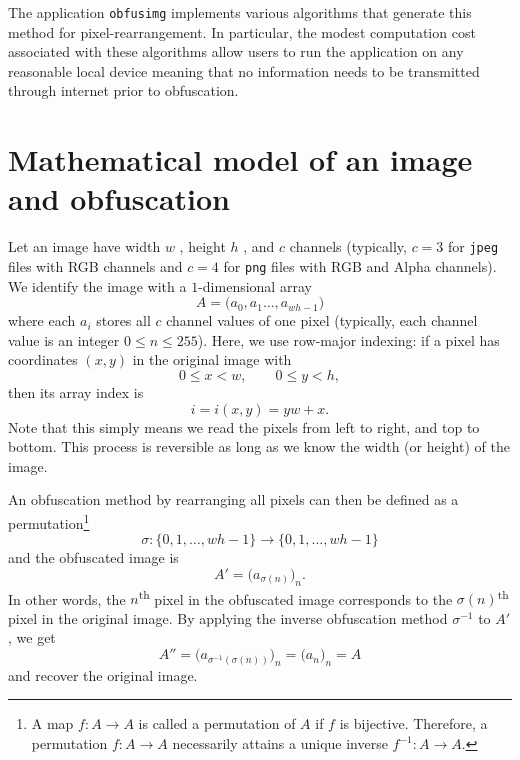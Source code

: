 \documentclass[12pt, a4paper, twoside]{article}
\begin{document}
The application \texttt{obfusimg} implements various algorithms that generate this method for pixel-rearrangement. In particular, the modest computation cost associated with these algorithms allow users to run the application on any reasonable local device meaning that no information needs to be transmitted through internet prior to obfuscation.

\section{Mathematical model of an image and obfuscation}

Let an image have width $w$ \si{\pixel}, height $h$ \si{\pixel}, and $c$ channels (typically, $c = 3$ for \texttt{jpeg} files with RGB channels and $c = 4$ for \texttt{png} files with RGB and Alpha channels). We identify the image with a $1$-dimensional array
\begin{equation}
    A = \bigl(a_0, a_1 \ldots, a_{w h - 1}\bigr)
\end{equation}
where each $a_i$ stores all $c$ channel values of one pixel (typically, each channel value is an integer $0 \leq n \leq 255$). Here, we use row-major indexing: if a pixel has coordinates $(x, y)$ in the original image with
\begin{equation}
    0 \leq x < w, \qquad 0 \leq y < h,
\end{equation}
then its array index is
\begin{equation}
    i = i(x, y) = y w + x.
\end{equation}
Note that this simply means we read the pixels from left to right, and top to bottom. This process is reversible as long as we know the width (or height) of the image.

An obfuscation method by rearranging all pixels can then be defined as a permutation\footnote{A map $f\colon A \to A$ is called a permutation of $A$ if $f$ is bijective. Therefore, a permutation $f\colon A \to A$ necessarily attains a unique inverse $f^{-1}\colon A \to A$.}
\begin{equation}
    \sigma\colon \{0, 1, \ldots, w h - 1 \} \to \{0, 1, \ldots, w h - 1 \}
\end{equation}
and the obfuscated image is
\begin{equation}
    A' = \bigl(a_{\sigma(n)}\bigr)_n.
\end{equation}
In other words, the $n$\textsuperscript{th} pixel in the obfuscated image corresponds to the $\sigma(n)$\textsuperscript{th} pixel in the original image. By applying the inverse obfuscation method $\sigma^{-1}$ to $A'$, we get
\begin{equation}
    A'' = \bigl(a_{\sigma^{-1}(\sigma(n))}\bigr)_n = \bigl(a_{n}\bigr)_n = A
\end{equation}
and recover the original image.
\end{document}
